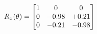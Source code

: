 \documentclass[preview]{standalone}
\begin{document}
\begin{align*}
\special{dvisvgm:raw <g id='unique000'>}R_{x}(\theta) = \begin{bmatrix}1 & 0 & 0 \\0 & -0.98 & +0.21 \\0 & -0.21 & -0.98\end{bmatrix}\special{dvisvgm:raw </g>}
\end{align*}
\end{document}
